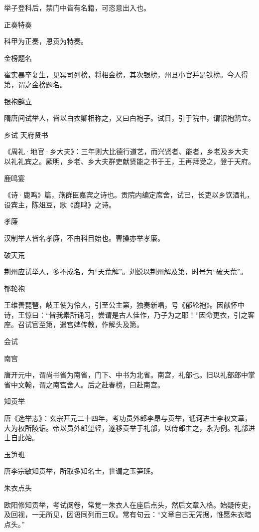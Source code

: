 \documentclass[a4paper,12pt,UTF8,twoside]{ctexbook}
\begin{document}
    举子登科后，禁门中皆有名籍，可恣意出入也。
    
    正奏特奏
    
    科甲为正奏，恩贡为特奏。
    
    金榜题名
    
    崔实暴卒复生，见冥司列榜，将相金榜，其次银榜，州县小官并是铁榜。今人得第，谓之金榜题名。
    
    银袍鹄立
    
    隋唐间试举人，皆以白衣卿相称之，又曰白袍子。试日，引于院中，谓银袍鹄立。
    
    乡试
    天府贤书
    
    《周礼·地官·乡大夫》：三年则大比德行道艺，而兴贤者、能者，乡老及乡大夫以礼礼宾之。厥明，乡老、乡大夫群吏献贤能之书于王，王再拜受之，登于天府。
    
    鹿鸣宴
    
    《诗·鹿鸣》篇，燕群臣嘉宾之诗也。贡院内编定席舍，试已，长吏以乡饮酒礼，设宾主，陈俎豆，歌《鹿鸣》之诗。
    
    孝廉
    
    汉制举人皆名孝廉，不由科目始也。曹操亦举孝廉。
    
    破天荒
    
    荆州应试举人，多不成名，为“天荒解”。刘蜕以荆州解及第，时号为“破天荒”。
    
    郁轮袍
    
    王维善琵琶，岐王使为伶人，引至公主第，独奏新唱，号《郁轮袍》。因献怀中诗，王惊曰：“皆我素所诵习，尝谓是古人佳作，乃子为之耶！”因命更衣，引之客座。召试官至第，遣宫婢传教，作解头及第。
    
    会试
    
    南宫
    
    唐开元中，谓尚书省为南省，门下、中书为北省。南宫，礼部也。旧以礼部郎中掌省中文翰，谓之南宫舍人。后之赴春榜，曰赴南宫。
    
    知贡举
    
    唐《选举志》：玄宗开元二十四年，考功员外郎李昂与贡举，诋诃进士李权文章，大为权所陵诟。帝以员外郎望轻，遂移贡举于礼部，以侍郎主之，永为例。礼部进士自此始。
    
    玉笋班
    
    唐李宗敏知贡举，所取多知名士，世谓之玉笋班。
    
    朱衣点头
    
    欧阳修知贡举，考试阅卷，常觉一朱衣人在座后点头，然后文章入格。始疑传吏，及回视，一无所见，因语同列而三叹。常有句云：“文章自古无凭据，惟愿朱衣暗点头。”
    
\end{document}
